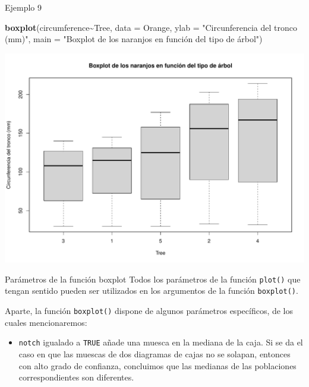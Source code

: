 \documentclass[
  ignorenonframetext,
]{beamer}
\newenvironment{Shaded}{\begin{snugshade}}{\end{snugshade}}
\newcommand{\AttributeTok}[1]{\textcolor[rgb]{0.13,0.29,0.53}{#1}}
\newcommand{\FunctionTok}[1]{\textcolor[rgb]{0.13,0.29,0.53}{\textbf{#1}}}
\newcommand{\NormalTok}[1]{#1}
\newcommand{\SpecialCharTok}[1]{\textcolor[rgb]{0.81,0.36,0.00}{\textbf{#1}}}
\newcommand{\StringTok}[1]{\textcolor[rgb]{0.31,0.60,0.02}{#1}}
\providecommand{\tightlist}{%
  \setlength{\itemsep}{0pt}\setlength{\parskip}{0pt}}
\begin{document}
\begin{frame}[fragile]{Ejemplo 9}
\label{ejemplo-9}
\begin{Shaded}
\begin{Highlighting}[]
\FunctionTok{boxplot}\NormalTok{(circumference}\SpecialCharTok{\textasciitilde{}}\NormalTok{Tree, }\AttributeTok{data =}\NormalTok{ Orange, }\AttributeTok{ylab =} \StringTok{"Circunferencia del tronco (mm)"}\NormalTok{, }
        \AttributeTok{main =} \StringTok{"Boxplot de los naranjos en función del tipo de árbol"}\NormalTok{)}
\end{Highlighting}
\end{Shaded}

\includegraphics[width=0.8\linewidth]{R_base_files/figure-beamer/unnamed-chunk-190-1}
\end{frame}

\begin{frame}[fragile]{Parámetros de la función boxplot}
\label{paruxe1metros-de-la-funciuxf3n-boxplot}
Todos los parámetros de la función \texttt{plot()} que tengan sentido
pueden ser utilizados en los argumentos de la función
\texttt{boxplot()}.

Aparte, la función \texttt{boxplot()} dispone de algunos parámetros
específicos, de los cuales mencionaremos:

\begin{itemize}
\tightlist
\item
  \texttt{notch} igualado a \texttt{TRUE} añade una muesca en la mediana
  de la caja. Si se da el caso en que las muescas de dos diagramas de
  cajas no se solapan, entonces con alto grado de confianza, concluimos
  que las medianas de las poblaciones correspondientes son diferentes.
\end{itemize}
\end{frame}
\end{document}
